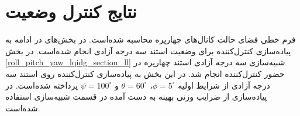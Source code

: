 \section{نتایج کنترل وضعیت}\label{3DOF_lqidg_section}
فرم خطی فضای حالت کانال‌های چهارپره محاسبه شده‌است. در بخش‌های
در ادامه به پیاده‌سازی کنترل‌کننده برای وضعیت استند سه درجه آزادی انجام شده‌است.
%
%
%
%
%
در بخش
\ref{roll_pitch_yaw_lqidg_section_ll}
شبیه‌سازی سه درجه آزادی استند چهارپره در حضور کنترل‌کننده  انجام شد. در این بخش به پیاده‌سازی کنترل‌کننده  روی استند سه درجه آزادی از شرایط اولیه
$\phi = 5^{\circ}$،
$\theta = 60^{\circ}$
و
$\psi = 100^{\circ}$
 پرداخته شده‌است.
در پیاده‌سازی از ضرایب وزنی بهینه به دست آمده در قسمت شبیه‌سازی استفاده شده‌است.


